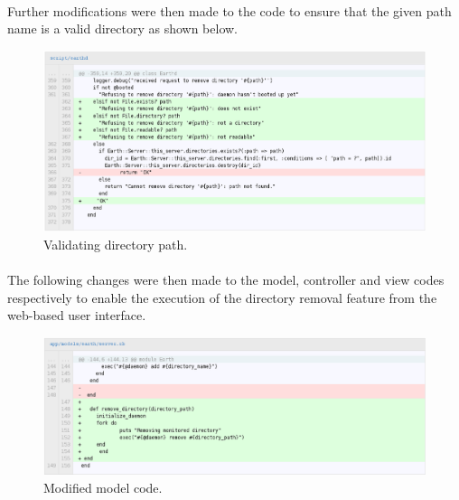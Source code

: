 \documentclass[10pt,a4,oneside]{article}
\begin{document}
\newpage

\paragraph{}
Further modifications were then made to the code to ensure that the given 
path name is a valid directory as shown below.

\begin{figure}[h!]
\begin{centering}
\includegraphics[width=150mm]{figs/earthd2}
\end{centering}
\caption{Validating directory path.}
\label{fig:earthd2}
\end{figure}


\newpage

\paragraph{}
The following changes were then made to the model, controller and view 
codes respectively to enable the execution of the directory removal 
feature from the web-based user interface.


\begin{figure}[h!]
\begin{centering}
\includegraphics[width=150mm]{figs/earthmodel}
\end{centering}
\caption{Modified model code.}
\label{fig:earthmodel}
\end{figure}
\end{document}
